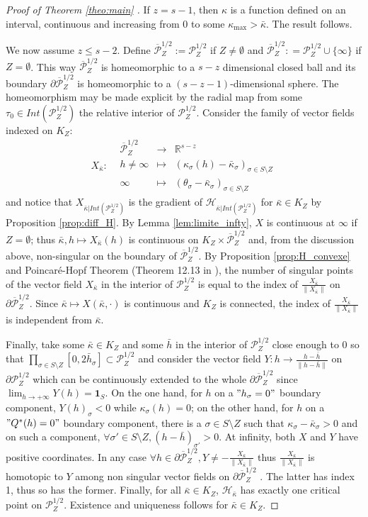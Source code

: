 \documentclass[a4paper,12pt]{article}
\def\adm{\P}
\def\RR{\mathbb{R}}
\def\adm{\mathcal{P}}
\def\P{\mathcal{P}}
\newcommand{\functiondeux}[7]{\displaystyle#1:\begin{array}{l|rcl}
& \displaystyle #2 & \longrightarrow & \displaystyle #3 \\
	& \displaystyle #4 & \longmapsto & \displaystyle #5 \\ 
	& \displaystyle #6 & \longmapsto & \displaystyle #7\end{array}}
\theoremstyle{definition}
\begin{document}
\begin{proof}[Proof of Theorem \ref{theo:main} ]
				If $z=s-1$, then $\kappa$ is a function defined on an interval, continuous and increasing from $0$ to some $\kappa_{\max}>\bar\kappa$. The result follows. 
				
				We now assume $z\leq s-2$. Define $\overline{\P}_Z^{1/2}:= \P_Z^{1/2}$ if $Z\neq\emptyset$ and $\overline{\P}_Z^{1/2}: = \P_Z^{1/2} \cup \{\infty\}$ if $Z=\emptyset$. This way $\overline{\P}_Z^{1/2}$ is homeomorphic to a $s-z$ dimensional closed ball and its boundary $\partial\overline{\P}_Z^{1/2}$ is homeomorphic to a $(s-z-1)$-dimensional sphere. The homeomorphism may be made explicit by the radial map from some $\tau_0\in Int(\P_Z^{1/2})$ the relative interior of $\P_Z^{1/2}$.
				Consider the family of vector fields indexed on $K_Z$: $$\functiondeux{X_{\bar\kappa}}{\overline{\P}_Z^{1/2}}{\RR^{s-z}}{h\neq\infty}{(\kappa_\sigma(h)-\bar\kappa_\sigma)_{\sigma\in S\setminus Z}}{\infty}{(\theta_\sigma-\bar\kappa_\sigma)_{\sigma\in S\setminus Z}} $$
				and notice that $X_{\bar\kappa|Int(\P_Z^{1/2})}$ is the gradient of $\mathcal{H}_{\bar\kappa|Int(\P_Z^{1/2})}$ for $\bar\kappa\in K_Z$ by Proposition \ref{prop:diff_H}.
				 By Lemma \ref{lem:limite_infty}, $X$ is continuous at $\infty$ if $Z=\emptyset$; thus $\bar\kappa,h\mapsto X_{\bar\kappa}(h)$ is continuous on $K_Z\times\overline{\P}_Z^{1/2}$ and, from the discussion above, non-singular on the boundary of $\overline{\adm}_Z^{1/2}$. By Proposition \ref{prop:H_convexe} and Poincaré-Hopf Theorem  (Theorem 12.13 in \cite{MR1700700}),  the number of singular points of the vector field $X_{\bar\kappa}$ in the interior of $\P_Z^{1/2}$ is equal to the index of $\frac{X_{\bar\kappa}}{\|X_{\bar\kappa}\|}$ on $\partial \overline{\P}_Z^{1/2}$. Since $\bar\kappa \mapsto X(\bar\kappa,\cdot)$ is continuous and $K_Z$ is connected, the index of $\frac{X_{\bar\kappa}}{\|X_{\bar\kappa}\|}$ is independent from $\bar\kappa$. 
				 
				 Finally, take some $\bar\kappa \in K_Z$ and some $\bar h$ in the interior of $\P_Z^{1/2}$ close enough to $0$ so that $\prod_{\sigma\in S\setminus Z} [0,2\bar h_\sigma] \subset \P_Z^{1/2}$ and consider the vector field $Y:h \rightarrow \frac{h-\bar h}{\| h-\bar h\|}$ on $\partial \P_Z^{1/2}$ which can be continuously extended to the whole $\partial\overline{\P}_Z^{1/2}$ since $\lim_{h\rightarrow +\infty} Y(h)=\mathbf{1}_S$. On the one hand, for $ h$ on a $" h_\sigma=0"$ boundary component, $Y( h)_\sigma<0$ while $\kappa_\sigma(h)=0$; on the other hand, for $ h$ on a $"Q^*( h)=0"$ boundary component, there is a $\sigma \in S\setminus Z$ such that $\kappa_\sigma-\bar\kappa_\sigma>0$ and on such a component, $\forall \sigma'\in S\setminus Z, ( h-\bar h)_{\sigma'}>0$. At infinity, both $X$ and $Y$ have positive coordinates. In any case $\forall h\in \partial \overline{\P}_Z^{1/2}, Y\neq - \frac{X_{\bar\kappa}}{\|X_{\bar\kappa}\|}$ thus $\frac{X_{\bar\kappa}}{\|X_{\bar\kappa}\|}$ is homotopic to $Y$ among non singular vector fields on $\partial \overline{\P}_Z^{1/2}$ . The latter has index 1, thus so has the former. Finally, for all $\bar\kappa\in K_Z$, $\mathcal{H}_{\bar\kappa}$ has exactly one critical point on $\P_Z^{1/2}$. Existence and uniqueness follows for $\bar\kappa \in K_Z$.
				

\end{proof}
\end{document}

